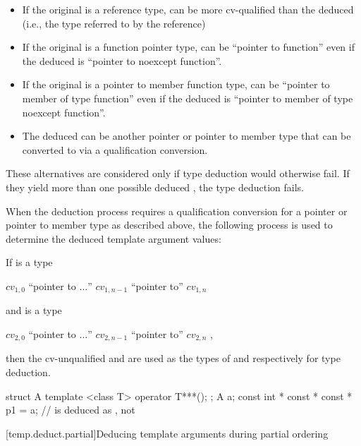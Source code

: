 \begin{itemize}
\item
If the original  is a reference type,
 can be more cv-qualified than the deduced 
(i.e., the type referred to by the reference)
\item
If the original  is a function pointer type,
 can be ``pointer to function''
even if the deduced  is ``pointer to noexcept function''.
\item
If the original  is a pointer to member function type,
 can be ``pointer to member of type function''
even if the deduced  is ``pointer to member of type noexcept function''.
\item
The deduced 
can be another pointer or pointer to member type that
can be converted to  via a qualification conversion.
\end{itemize}

\pnum
These alternatives are considered only if type deduction would
otherwise fail.
If they yield more than one possible deduced
,
the type deduction fails.

\pnum
When the deduction process requires a qualification conversion for a
pointer or pointer to member type as described above, the following
process is used to determine the deduced template argument values:

If
is a type
\begin{indented}
$\mathit{cv}_{1,0}$ ``pointer to $\ldots$'' $\mathit{cv}_{1,n-1}$ ``pointer to''
$\mathit{cv}_{1,n}$ 
\end{indented}
and
is a type
\begin{indented}
$\mathit{cv}_{2,0}$ ``pointer to $\ldots$'' $\mathit{cv}_{2,n-1}$ ``pointer to''
$\mathit{cv}_{2,n}$ ,
\end{indented}
then the cv-unqualified
and
are used as the types of
and
respectively for type deduction.
\begin{example}
\begin{codeblock}
struct A {
  template <class T> operator T***();
};
A a;
const int * const * const * p1 = a;     //  is deduced as , not 
\end{codeblock}
\end{example}

[temp.deduct.partial]{Deducing template arguments during partial ordering}

